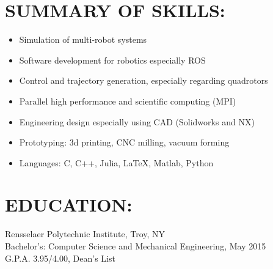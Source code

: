 \documentclass[margin]{res}
\begin{document}
  

\address{\bf Permanent\\ 3361 E. Maplewood Ave. \\   Centennial, CO 80121\\ {\bf phone: }(720) 270-3901 \\ {\bf email: }micahcorah@gmail.com}
\address{\bf Current\\ Williams 302c \\ 1999 Burdett Ave. \\   Troy, NY 12180  }

\begin{resume}                        
\section{SUMMARY OF SKILLS:}
  \begin{itemize}
    \item Simulation of multi-robot systems
    \item Software development for robotics especially ROS
    \item Control and trajectory generation, especially regarding quadrotors
    \item Parallel high performance and scientific computing (MPI)
    \item Engineering design especially using CAD (Solidworks and NX)
    \item Prototyping: 3d printing, CNC milling, vacuum forming
    \item Languages: C, C++, Julia, \LaTeX, Matlab, Python
	\end{itemize}
\section{EDUCATION:}
	Rensselaer Polytechnic Institute, Troy, NY \\
	Bachelor's: Computer Science and Mechanical Engineering, May 2015 \\
	G.P.A. 3.95/4.00, Dean's List

\end{resume}
\end{document}
